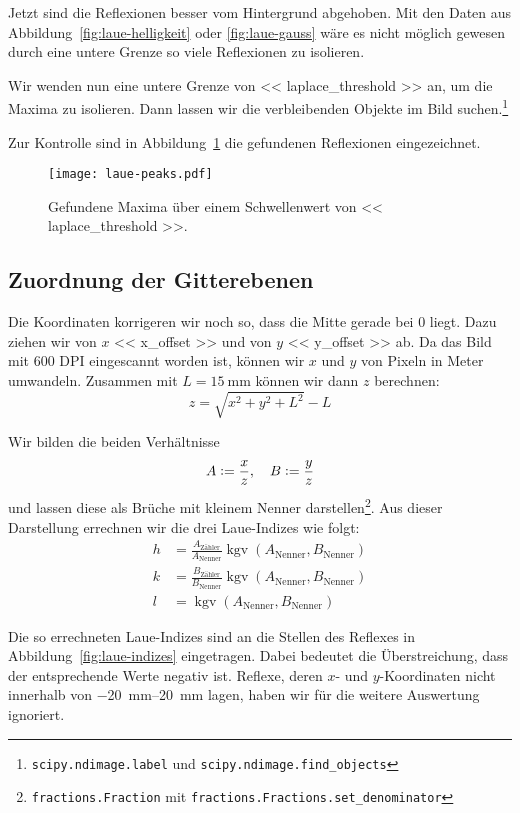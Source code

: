 Jetzt sind die Reflexionen besser vom Hintergrund abgehoben. Mit den Daten aus
Abbildung~\ref{fig:laue-helligkeit} oder \ref{fig:laue-gauss} wäre es nicht
möglich gewesen durch eine untere Grenze so viele Reflexionen zu isolieren.

Wir wenden nun eine untere Grenze von \num{<< laplace_threshold >>} an, um die
Maxima zu isolieren. Dann lassen wir die verbleibenden Objekte im Bild
suchen.\footnote{\texttt{scipy.ndimage.label} und
\texttt{scipy.ndimage.find\_objects}}

Zur Kontrolle sind in Abbildung~\ref{fig:laue-peaks} die gefundenen Reflexionen
eingezeichnet.

\begin{figure}[htbp]
    \centering
    \texttt{[image: laue-peaks.pdf]}
    \caption{%
        Gefundene Maxima über einem Schwellenwert von \num{<< laplace_threshold
        >>}.
    }
    \label{fig:laue-peaks}
\end{figure}

\subsection{Zuordnung der Gitterebenen}

Die Koordinaten korrigeren wir noch so, dass die Mitte gerade bei 0 liegt. Dazu
ziehen wir von $x$ \num{<< x_offset >>} und von $y$ \num{<< y_offset >>} ab. Da
das Bild mit 600 DPI eingescannt worden ist, können wir $x$ und $y$ von Pixeln
in Meter umwandeln. Zusammen mit $L = \SI{15}{\milli\meter}$ können wir dann
$z$ berechnen:
\[
    z = \sqrt{x^2 + y^2 + L^2} - L
\]

Wir bilden die beiden Verhältnisse
\[
    A := \frac xz
    ,\quad
    B := \frac yz
\]
und lassen diese als Brüche mit kleinem Nenner
darstellen\footnote{\texttt{fractions.Fraction} mit
\texttt{fractions.Fractions.set\_denominator}}. Aus dieser Darstellung
errechnen wir die drei Laue-Indizes wie folgt:
\begin{align*}
    h &= \frac{A_\text{Zähler}}{A_\text{Nenner}}
    \mathop{\mathrm{kgv}}(A_\text{Nenner}, B_\text{Nenner}) \\
    k &= \frac{B_\text{Zähler}}{B_\text{Nenner}}
    \mathop{\mathrm{kgv}}(A_\text{Nenner}, B_\text{Nenner}) \\
    l &= \mathop{\mathrm{kgv}}(A_\text{Nenner}, B_\text{Nenner})
\end{align*}

Die so errechneten Laue-Indizes sind an die Stellen des Reflexes in
Abbildung~\ref{fig:laue-indizes} eingetragen. Dabei bedeutet die
Überstreichung, dass der entsprechende Werte negativ ist. Reflexe, deren $x$-
und $y$-Koordinaten nicht innerhalb von \SIrange{-20}{20}{\milli\meter} lagen,
haben wir für die weitere Auswertung ignoriert.

